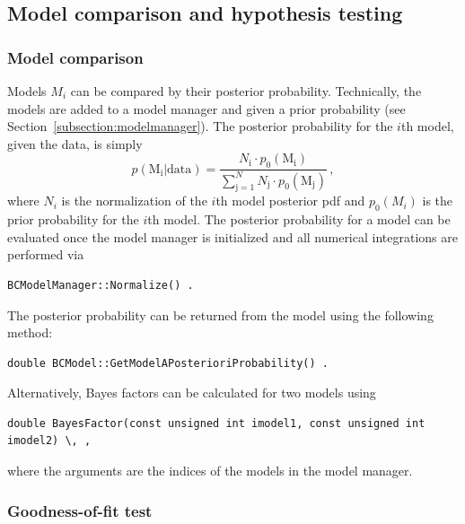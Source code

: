 \documentclass[11pt, a4paper]{article}
\begin{document}
\subsection{Model comparison and hypothesis testing} 


\subsubsection{Model comparison}

Models $M_{i}$ can be compared by their posterior
probability. Technically, the models are added to a model manager and
given a prior probability (see
Section~\ref{subsection:modelmanager}). The posterior probability for
the $i$th model, given the data, is simply
%
\begin{equation}
p(\mathrm{M_{i}}|\mathrm{data}) = \frac{N_{\mathrm{i}} \cdot p_{0}(\mathrm{M_{i}})}{\sum_{\mathrm{j} = 1}^{N} N_{\mathrm{j}} \cdot p_{0}(\mathrm{M_{j}})} \, , 
\end{equation}
%
where $N_{i}$ is the normalization of the $i$th model posterior pdf
and $p_{0}(M_{i})$ is the prior probability for the $i$th model. The
posterior probability for a model can be evaluated once the model
manager is initialized and all numerical integrations are performed
via
%
\begin{verbatim}
BCModelManager::Normalize() . 
\end{verbatim}
%
The posterior probability can be returned from the model using the
following method:
%
\begin{verbatim}
double BCModel::GetModelAPosterioriProbability() . 
\end{verbatim}

Alternatively, Bayes factors can be calculated for two models using
%
\begin{verbatim}
double BayesFactor(const unsigned int imodel1, const unsigned int imodel2) \, ,
\end{verbatim} 
%
\noindent
where the arguments are the indices of the models in the model
manager. 



\subsubsection{Goodness-of-fit test} 
\end{document}
